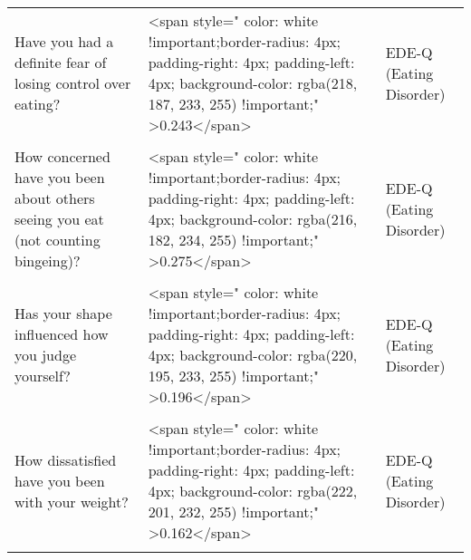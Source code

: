 \documentclass[border=1mm]{standalone}
\begin{document}
\begin{longtable}{lll}
\addlinespace
Have you had a definite fear of losing control over eating? & <span style="     color: white !important;border-radius: 4px; padding-right: 4px; padding-left: 4px; background-color: rgba(218, 187, 233, 255) !important;" >0.243</span> & EDE-Q (Eating Disorder)\\
\cellcolor{gray!10}{On what proportion of times eating did you feel guilty (not counting bingeing)?} & \cellcolor{gray!10}{<span style="     color: white !important;border-radius: 4px; padding-right: 4px; padding-left: 4px; background-color: rgba(220, 195, 233, 255) !important;" >0.201</span>} & \cellcolor{gray!10}{EDE-Q (Eating Disorder)}\\
How concerned have you been about others seeing you eat (not counting bingeing)? & <span style="     color: white !important;border-radius: 4px; padding-right: 4px; padding-left: 4px; background-color: rgba(216, 182, 234, 255) !important;" >0.275</span> & EDE-Q (Eating Disorder)\\
\cellcolor{gray!10}{Has your weight influenced how you judge yourself?} & \cellcolor{gray!10}{<span style="     color: white !important;border-radius: 4px; padding-right: 4px; padding-left: 4px; background-color: rgba(219, 190, 233, 255) !important;" >0.229</span>} & \cellcolor{gray!10}{EDE-Q (Eating Disorder)}\\
Has your shape influenced how you judge yourself? & <span style="     color: white !important;border-radius: 4px; padding-right: 4px; padding-left: 4px; background-color: rgba(220, 195, 233, 255) !important;" >0.196</span> & EDE-Q (Eating Disorder)\\
\addlinespace
\cellcolor{gray!10}{How upsetting would it be to weigh yourself weekly for four weeks?} & \cellcolor{gray!10}{<span style="     color: white !important;border-radius: 4px; padding-right: 4px; padding-left: 4px; background-color: rgba(215, 178, 234, 255) !important;" >0.296</span>} & \cellcolor{gray!10}{EDE-Q (Eating Disorder)}\\
How dissatisfied have you been with your weight? & <span style="     color: white !important;border-radius: 4px; padding-right: 4px; padding-left: 4px; background-color: rgba(222, 201, 232, 255) !important;" >0.162</span> & EDE-Q (Eating Disorder)\\
\cellcolor{gray!10}{How dissatisfied have you been with your shape?} & \cellcolor{gray!10}{<span style="     color: white !important;border-radius: 4px; padding-right: 4px; padding-left: 4px; background-color: rgba(220, 196, 232, 255) !important;" >0.194</span>} & \cellcolor{gray!10}{EDE-Q (Eating Disorder)}\\

\end{longtable}
\end{document}
